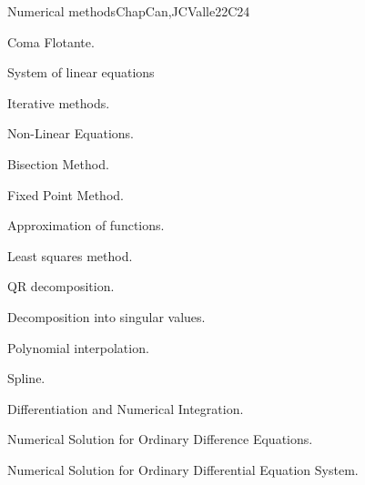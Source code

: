 \begin{syllabus}
 
 \begin{unit}{Numerical methods}{}{ChapCan,JCValle}{22}{C24}
   \begin{topics}
     \item Coma Flotante.
     \item System of linear equations
       \begin{subtopics}
         \item Iterative methods.
       \end{subtopics}
     \item Non-Linear Equations.
       \begin{subtopics}
         \item Bisection Method.
         \item Fixed Point Method.
       \end{subtopics}
     \item Approximation of functions.
       \begin{subtopics}
         \item Least squares method.
         \item QR decomposition.
         \item Decomposition into singular values.
       \end{subtopics}
     \item Polynomial interpolation.
     \item Spline.
     \item Differentiation and Numerical Integration.
     \item Numerical Solution for Ordinary Difference Equations.
     \item Numerical Solution for Ordinary Differential Equation System.
   \end{topics}
 

\end{unit}
\end{syllabus}
